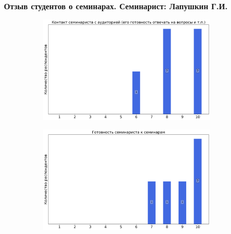         \subsubsection{Отзыв студентов о семинарах. Семинарист: Лапушкин Г.И.}
            \begin{figure}[H]
                \centering
                \begin{subfigure}[b]{0.45\textwidth}
                    \centering
                    \includegraphics[width=\textwidth]{images/3 course/Общая физика - квантовая физика/seminarists-marks-Лапушкин Г.И.-0.png}
                \end{subfigure}
                \begin{subfigure}[b]{0.45\textwidth}
                    \centering
                    \includegraphics[width=\textwidth]{images/3 course/Общая физика - квантовая физика/seminarists-marks-Лапушкин Г.И.-1.png}
                \end{subfigure}
                \begin{subfigure}[b]{0.45\textwidth}

\end{subfigure}
\end{figure}
